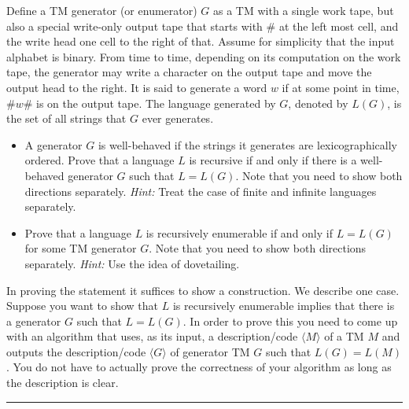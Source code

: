 \documentclass[11pt]{article}
\begin{document}

\item Define a TM generator (or enumerator) $G$ as a TM with a single
  work tape, but also a special write-only output tape that starts
  with $\#$ at the left most cell, and the write head one cell to the
  right of that.  Assume for simplicity that the input alphabet is
  binary.  From time to time, depending on its computation on the work
  tape, the generator may write a character on the output tape and
  move the output head to the right.  It is said to generate a word
  $w$ if at some point in time, $\#w\#$ is on the output tape. The
  language generated by $G$, denoted by $L(G)$, is the set of all
  strings that $G$ ever generates.
  \begin{itemize}
  \item A generator $G$ is well-behaved if the strings it generates
    are lexicographically ordered. Prove that a language $L$ is
    recursive if and only if there is a well-behaved generator $G$ such
    that $L=L(G)$. Note that you need
    to show both directions separately. {\em Hint:} Treat the case of finite and
    infinite languages separately.

  \item Prove that a language $L$ is recursively enumerable if and
    only if $L = L(G)$ for some TM generator $G$. Note that you need
    to show both directions separately. {\em Hint:} Use the idea of
    dovetailing.
  \end{itemize}
  In proving the statement it suffices to show a construction. We
  describe one case. Suppose you want to show that $L$ is recursively
  enumerable implies that there is a generator $G$ such that
  $L = L(G)$. In order to prove this you need to come up with an
  algorithm that uses, as its input, a description/code
  $\langle M \rangle$ of a TM $M$ and outputs the description/code
  $\langle G \rangle$ of generator TM $G$ such that $L(G) = L(M)$.  You
  do not have to actually prove the correctness of your algorithm as long as
  the description is clear.

\hrule


\begin{solution}


\end{solution}
\end{document}

